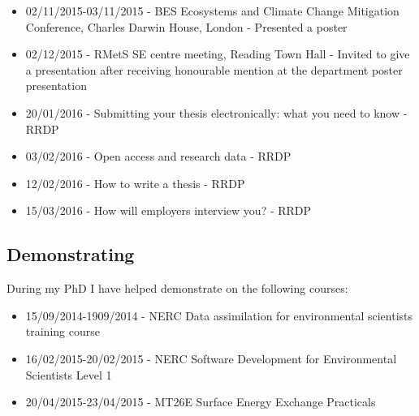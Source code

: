 \documentclass[11pt]{article}
\begin{document}
\begin{itemize}
\item 02/11/2015-03/11/2015 - BES Ecosystems and Climate Change Mitigation Conference, Charles Darwin House, London - Presented a poster

\item 02/12/2015 - RMetS SE centre meeting, Reading Town Hall - Invited to give a presentation after receiving honourable mention at the department poster presentation

\item 20/01/2016 - Submitting your thesis electronically: what you need to know - RRDP

\item 03/02/2016 - Open access and research data - RRDP

\item 12/02/2016 - How to write a thesis - RRDP

\item 15/03/2016 - How will employers interview you? - RRDP
\end{itemize}

\subsection{Demonstrating}
During my PhD I have helped demonstrate on the following courses:
\begin{itemize}
\item 15/09/2014-1909/2014 - NERC Data assimilation for environmental scientists training course

\item 16/02/2015-20/02/2015 - NERC Software Development for Environmental Scientists Level 1

\item 20/04/2015-23/04/2015 - MT26E Surface Energy Exchange Practicals
\end{itemize}


{}
%
\end{document}
